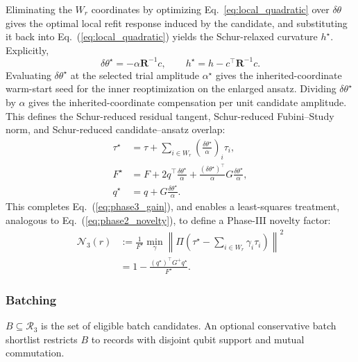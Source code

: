 \documentclass[
  reprint,
  amsmath,
  amssymb,
  aps,
  pra,
  nofootinbib,
  superscriptaddress,
  floatfix
]{revtex4-2}
\begin{document}
Eliminating the \(W_r\) coordinates by optimizing Eq.~\ref{eq:local_quadratic} over $\delta\theta$ gives the optimal local refit response induced by the candidate, and substituting it back into Eq.~(\ref{eq:local_quadratic}) yields the Schur-relaxed curvature $h^\star$. Explicitly,
\begin{equation}
\delta\theta^\star=-\alpha\mathbf R^{-1}c,
\qquad
h^\star=h-c^{\top}\mathbf R^{-1}c .
\label{eq:phase3_schur_response}
\end{equation}
Evaluating $\delta\theta^\star$ at the selected trial amplitude $\alpha^\star$ gives the inherited-coordinate warm-start seed for the inner reoptimization on the enlarged ansatz. Dividing $\delta\theta^\star$ by $\alpha$ gives the inherited-coordinate compensation per unit candidate amplitude. This defines the Schur-reduced residual tangent, Schur-reduced Fubini--Study norm, and Schur-reduced candidate--ansatz overlap:
\begin{equation}
\begin{aligned}
\tau^\star
&=\tau+\sum_{i\in W_r}\left(\frac{\delta\theta^\star}{\alpha}\right)_i\tau_i,\\
F^\star
&=F+2q^{\top}\frac{\delta\theta^\star}{\alpha}
+\frac{(\delta\theta^\star)^{\top}}{\alpha}G\frac{\delta\theta^\star}{\alpha},\\
q^\star
&=q+G\frac{\delta\theta^\star}{\alpha}.
\end{aligned}
\label{eq:phase3_star_geometry}
\end{equation}
This completes Eq.~(\ref{eq:phase3_gain}), and enables a least-squares treatment, analogous to Eq.~(\ref{eq:phase2_novelty}), to define a Phase-III novelty factor:
\begin{equation}
\begin{aligned}
\mathcal N_3(r)
&:=
\frac{1}{F^\star}
\min_{\gamma}
\left\|
\Pi\left(\tau^\star-\sum_{i\in W_r}\gamma_i\tau_i\right)
\right\|^2 \\
&=
1-\frac{(q^\star)^{\top}G^+q^\star}
{F^\star}.
\end{aligned}
\label{eq:phase3_novelty}
\end{equation}

\subsubsection{Batching}

$B\subseteq\mathcal R_3$ is the set of eligible batch candidates.  An optional conservative batch shortlist restricts \(B\) to records with disjoint qubit support and mutual commutation.
\end{document}
